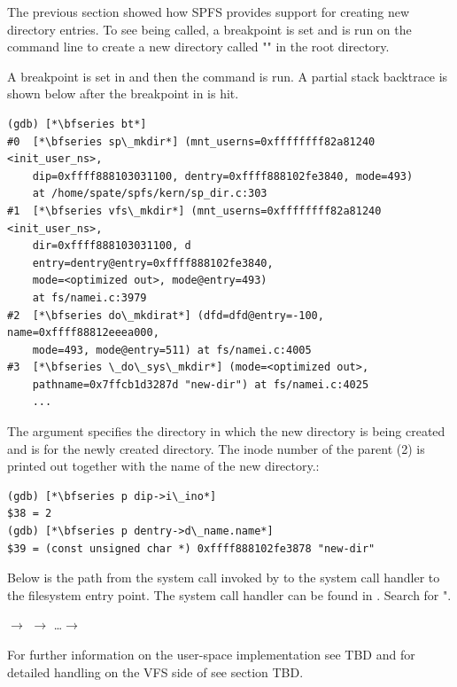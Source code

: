 The previous section showed how SPFS provides support for creating new directory entries. To see  being called, a breakpoint is set and  is run on the command line to create a new directory called "" in the root directory.

A breakpoint is set in  and then the  command is run. A partial stack backtrace is shown below after the breakpoint in  is hit.

\begin{lstlisting}
(gdb) [*\bfseries bt*]
#0  [*\bfseries sp\_mkdir*] (mnt_userns=0xffffffff82a81240 <init_user_ns>, 
    dip=0xffff888103031100, dentry=0xffff888102fe3840, mode=493) 
    at /home/spate/spfs/kern/sp_dir.c:303
#1  [*\bfseries vfs\_mkdir*] (mnt_userns=0xffffffff82a81240 <init_user_ns>, 
    dir=0xffff888103031100, d
    entry=dentry@entry=0xffff888102fe3840, 
    mode=<optimized out>, mode@entry=493) 
    at fs/namei.c:3979
#2  [*\bfseries do\_mkdirat*] (dfd=dfd@entry=-100, name=0xffff88812eeea000, 
    mode=493, mode@entry=511) at fs/namei.c:4005
#3  [*\bfseries \_do\_sys\_mkdir*] (mode=<optimized out>, 
    pathname=0x7ffcb1d3287d "new-dir") at fs/namei.c:4025
    ...
\end{lstlisting}

\noindent
The  argument specifies the directory in which the new directory is being created and  is for the newly created directory. The inode number of the parent (2) is printed out together with the name of the new directory.:

\begin{lstlisting}
(gdb) [*\bfseries p dip->i\_ino*]
$38 = 2
(gdb) [*\bfseries p dentry->d\_name.name*]
$39 = (const unsigned char *) 0xffff888102fe3878 "new-dir"
\end{lstlisting}

\noindent
Below is the path from the  system call invoked by  to the system call handler to the filesystem entry point. The  system call handler can be found in . Search for ".

\small
\bigskip
{} $\rightarrow$   $\rightarrow$ \ldots $\rightarrow$ 

\bigskip
\normalsize
\noindent
For further information on the user-space implementation see TBD and for detailed handling on the VFS side of  see section TBD.

